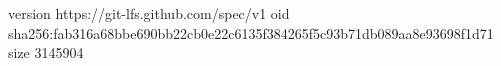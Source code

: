 version https://git-lfs.github.com/spec/v1
oid sha256:fab316a68bbe690bb22cb0e22c6135f384265f5c93b71db089aa8e93698f1d71
size 3145904
